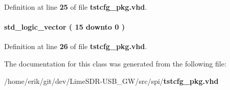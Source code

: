 Definition at line {\bf 25} of file {\bf tstcfg\+\_\+pkg.\+vhd}.

\paragraph[{T\+X\+\_\+\+T\+S\+T\+\_\+Q}]{ {\bfseries \textcolor{comment}{std\+\_\+logic\+\_\+vector}\textcolor{vhdlchar}{ }\textcolor{vhdlchar}{(}\textcolor{vhdlchar}{ }\textcolor{vhdlchar}{ } \textcolor{vhdldigit}{15} \textcolor{vhdlchar}{ }\textcolor{keywordflow}{downto}\textcolor{vhdlchar}{ }\textcolor{vhdlchar}{ } \textcolor{vhdldigit}{0} \textcolor{vhdlchar}{ }\textcolor{vhdlchar}{)}\textcolor{vhdlchar}{ }} \hspace{0.3cm}{\ttfamily [Record]}}\label{clasststcfg__pkg_afa62bb7e74edf3752ddf9861d345cec7}


Definition at line {\bf 26} of file {\bf tstcfg\+\_\+pkg.\+vhd}.



The documentation for this class was generated from the following file\+:\begin{DoxyCompactItemize}
\item 
/home/erik/git/dev/\+Lime\+S\+D\+R-\/\+U\+S\+B\+\_\+\+G\+W/src/spi/{\bf tstcfg\+\_\+pkg.\+vhd}\end{DoxyCompactItemize}
